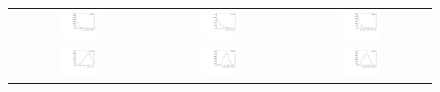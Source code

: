 \begin{figure}
\centering
\begin{tabular}{ccc}
\includegraphics[width=0.3\textwidth]{ANA_resources/Plots/Monte_carlo/data_vs_MC/weight/Kpipipi/acos(Bd_DIRA_OWNPV)_2016.pdf} & \includegraphics[width=0.3\textwidth]{ANA_resources/Plots/Monte_carlo/data_vs_MC/weight/Kpipipi/Bd_IPCHI2_OWNPV_2016.pdf} & \includegraphics[width=0.3\textwidth]{ANA_resources/Plots/Monte_carlo/data_vs_MC/weight/Kpipipi/Bd_LOKI_VFASPF_VCHI2VDOF_2016.pdf} \\
\includegraphics[width=0.3\textwidth]{ANA_resources/Plots/Monte_carlo/data_vs_MC/weight/Kpipipi/Bd_ptasy_1_50_2016.pdf} & \includegraphics[width=0.3\textwidth]{ANA_resources/Plots/Monte_carlo/data_vs_MC/weight/Kpipipi/log10(D0_IPCHI2_OWNPV)_2016.pdf} & \includegraphics[width=0.3\textwidth]{ANA_resources/Plots/Monte_carlo/data_vs_MC/weight/Kpipipi/log10(KstarK_IPCHI2_OWNPV)_2016.pdf} \\

\end{tabular}
\end{figure}
